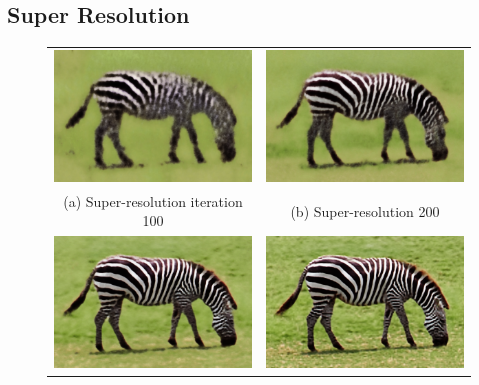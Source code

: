 \documentclass[A4]{article}
\begin{document}
\subsection{Super Resolution}
\begin{figure}[H]
\begin{tabular}{cc}
\includegraphics[width=80mm]{sr-iteration-100.png} & \includegraphics[width=80mm]{sr-iteration-200.png} \\
(a) Super-resolution iteration 100 & (b) Super-resolution 200 \\[6pt]
\includegraphics[width=80mm]{sr-iteration-400.png} & \includegraphics[width=80mm]{sr-iteration-2000.png} \\

\end{tabular}
\end{figure}
\end{document}

